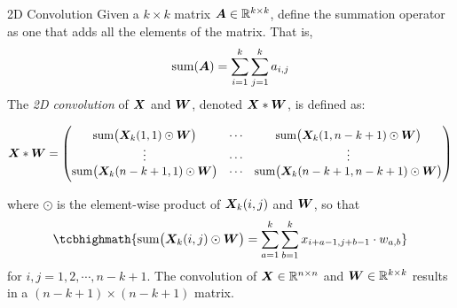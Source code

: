 \begin{frame}{2D Convolution}
Given a $k \times k$ matrix ${\boldsymbol A} \in {\mathord{\mathbb R}}^{k \times k}$, 
define the summation operator as one
that adds all the elements of the matrix. That is,
\begin{align*}
    \operatorname*{sum}({\boldsymbol A}) = \sum_{i=1}^k \sum_{j=1}^k a_{i,j}
\end{align*}
The {\em 2D convolution} of ${\boldsymbol X}$ and ${\boldsymbol W}$, denoted ${\boldsymbol X} \ast
{\boldsymbol W}$, is defined as:

\begin{small}
\begin{equation*}
        {\boldsymbol X} \ast {\boldsymbol W} = \begin{pmatrix}  && \\[-1em]
        \operatorname*{sum}\bigl({\boldsymbol X}_k(1,1) \odot {\boldsymbol W}\bigr) &
        \cdots & \operatorname*{sum}\bigl({\boldsymbol X}_k(1, n-k+1) \odot {\boldsymbol W}\bigr)\\
        \vdots & \cdots & \vdots\\
        \operatorname*{sum}\bigl({\boldsymbol X}_k(n-k+1,1) \odot {\boldsymbol W}\bigr) &
        \cdots & 
        \operatorname*{sum} \bigl({\boldsymbol X}_k(n-k+1, n-k+1) \odot {\boldsymbol W}\bigr)\\[-1em]
&& \end{pmatrix}
\end{equation*}
\end{small}
where $\odot$ is the
element-wise product of ${\boldsymbol X}_k(i,j)$ and ${\boldsymbol W}$, so that
\begin{align}
    \tcbhighmath{
    \summ\bigl(\bX_k(i,j) \odot \bW\bigr) = \sum_{a=1}^k \sum_{b=1}^k x_{i+a-1, j+b-1}
\cdot w_{a, b}}
\end{align}
for $i, j = 1,2,\cdots,n-k+1$.
The convolution of ${\boldsymbol X} \in {\mathord{\mathbb R}}^{n\times n}$ and
${\boldsymbol W} \in {\mathord{\mathbb R}}^{k \times k}$ results in a $(n-k+1) \times (n-k+1)$ matrix.
\end{frame}
%
